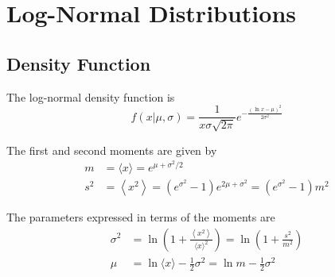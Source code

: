 \documentclass[../../main.tex]{subfiles}
\begin{document}
\chapter{Log-Normal Distributions}

\section{Density Function}
The log-normal density function is
\begin{equation}
    f(x | \mu, \sigma) = 
    \frac{
        1
    }{
        x \sigma \sqrt{2 \pi}
    }
    e^{
        -\frac{
            (\ln{x} - \mu)^2
        }{
            2 \sigma^2
        }
    }
\end{equation}

The first and second moments are given by
\begin{align}
    \label{eq:lognormmoments}
    m &= \langle x \rangle = e^{\mu + \sigma^2 / 2} \\
    s^2 &= \left\langle x^2 \right\rangle
         = \left( e^{\sigma^2} - 1 \right) e^{2\mu + \sigma^2}
         = \left( e^{\sigma^2} - 1 \right) m^2
\end{align}

The parameters expressed in terms of the moments are
\begin{align}
    \label{eq:paramslognorm}
    \sigma^2 &= \ln{\left(
            1 + \frac{
              \left\langle x^2 \right\rangle }{
              {\langle x \rangle}^2
            }
        \right)
    } 
    = \ln{\left(1 + \frac{ s^2 }{ m^2 } \right) }\nonumber\nonumber\\
    \mu &= \ln{\langle x \rangle} - \frac{1}{2} \sigma^2
        = \ln{m} - \frac{1}{2} \sigma^2
\end{align}
\end{document}
